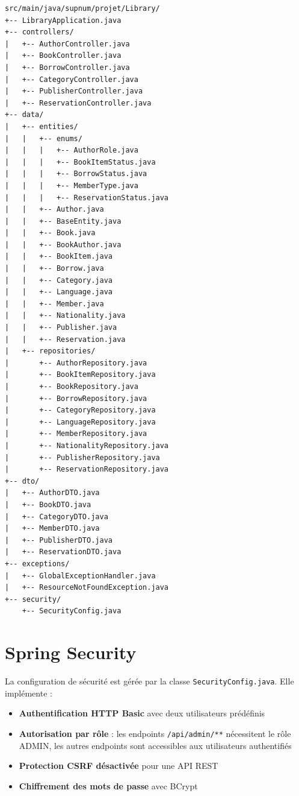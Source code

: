 \documentclass[12pt,a4paper,twoside]{report}
\begin{document}
\begin{lstlisting}[caption=Organisation des packages Java]
src/main/java/supnum/projet/Library/
+-- LibraryApplication.java
+-- controllers/
|   +-- AuthorController.java
|   +-- BookController.java
|   +-- BorrowController.java
|   +-- CategoryController.java
|   +-- PublisherController.java
|   +-- ReservationController.java
+-- data/
|   +-- entities/
|   |   +-- enums/
|   |   |   +-- AuthorRole.java
|   |   |   +-- BookItemStatus.java
|   |   |   +-- BorrowStatus.java
|   |   |   +-- MemberType.java
|   |   |   +-- ReservationStatus.java
|   |   +-- Author.java
|   |   +-- BaseEntity.java
|   |   +-- Book.java
|   |   +-- BookAuthor.java
|   |   +-- BookItem.java
|   |   +-- Borrow.java
|   |   +-- Category.java
|   |   +-- Language.java
|   |   +-- Member.java
|   |   +-- Nationality.java
|   |   +-- Publisher.java
|   |   +-- Reservation.java
|   +-- repositories/
|       +-- AuthorRepository.java
|       +-- BookItemRepository.java
|       +-- BookRepository.java
|       +-- BorrowRepository.java
|       +-- CategoryRepository.java
|       +-- LanguageRepository.java
|       +-- MemberRepository.java
|       +-- NationalityRepository.java
|       +-- PublisherRepository.java
|       +-- ReservationRepository.java
+-- dto/
|   +-- AuthorDTO.java
|   +-- BookDTO.java
|   +-- CategoryDTO.java
|   +-- MemberDTO.java
|   +-- PublisherDTO.java
|   +-- ReservationDTO.java
+-- exceptions/
|   +-- GlobalExceptionHandler.java
|   +-- ResourceNotFoundException.java
+-- security/
    +-- SecurityConfig.java
\end{lstlisting}

\section{Spring Security}

La configuration de sécurité est gérée par la classe \texttt{SecurityConfig.java}. Elle implémente :

\begin{itemize}
    \item \textbf{Authentification HTTP Basic} avec deux utilisateurs prédéfinis
    \item \textbf{Autorisation par rôle} : les endpoints \texttt{/api/admin/**} nécessitent le rôle ADMIN, les autres endpoints sont accessibles aux utilisateurs authentifiés
    \item \textbf{Protection CSRF désactivée} pour une API REST
    \item \textbf{Chiffrement des mots de passe} avec BCrypt
\end{itemize}
\end{document}
